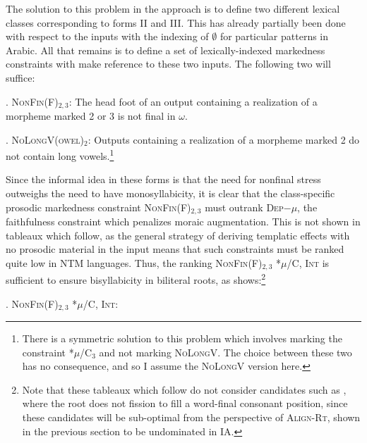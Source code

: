 \documentclass[12pt,twoside,letterpaper]{article}
\begin{document}
The solution to this problem in the \cite{paterToAppear} approach is to define two different lexical classes corresponding to forms II and III. This has already partially been done with respect to the inputs with the indexing of $\emptyset$ for particular patterns in Arabic. All that remains is to define a set of lexically-indexed markedness constraints with make reference to these two inputs. The following two will suffice:

\ex. \textsc{NonFin}(F)$_{2,3}$: The head foot of an output containing a realization of a morpheme marked 2 or 3 is not final in $\omega$.

\ex. \textsc{NoLongV(owel)}$_{2}$: Outputs containing a realization of a morpheme marked 2 do not contain long vowels.\footnote{There is a symmetric solution to this problem which involves marking the constraint *$\mu$/\textsc{C}$_3$ and not marking \textsc{NoLongV}. The choice between these two has no consequence, and so I assume the \textsc{NoLongV} version here.}

Since the informal idea in these forms is that the need for nonfinal stress outweighs the need to have monosyllabicity, it is clear that the class-specific prosodic markedness constraint \textsc{NonFin}(F)$_{2,3}$ must outrank \textsc{Dep}$-\mu$, the faithfulness constraint which penalizes moraic augmentation. This is not shown in tableaux which follow, as the general strategy of deriving templatic effects with no prosodic material in the input means that such constraints must be ranked quite low in NTM languages. Thus, the ranking \textsc{NonFin}(F)$_{2,3}$ \OTdom \textsc{*$\mu$/C}, \textsc{Int} is sufficient to ensure bisyllabicity in biliteral roots, as \Next shows:\footnote{Note that these tableaux which follow do not consider candidates such as {\em {}}, where the root does not fission to fill a word-final consonant position, since these candidates will be sub-optimal from the perspective of \textsc{Align-Rt}, shown in the previous section to be undominated in IA.}

\ex. \textsc{NonFin}(F)$_{2,3}$ \OTdom \textsc{*$\mu$/C}, \textsc{Int}:\\\begin{OTtableau}{4}
  \OTcandrow*{[(maar)]}{*!, , ,*}
\end{OTtableau}
\end{document}
